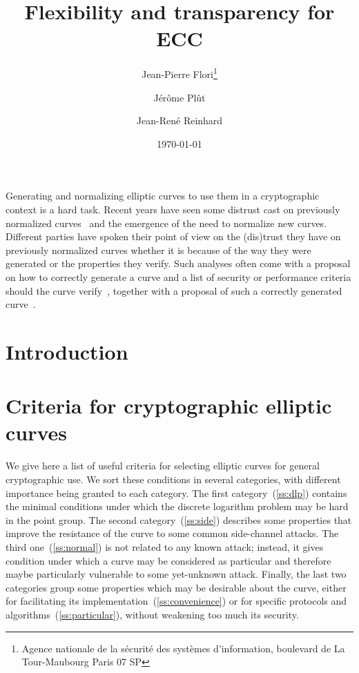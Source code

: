 \documentclass[twocolumn,letterpaper]{article}
\begin{document}
\sloppy

\title{Flexibility and transparency for ECC}
\author{Jean-Pierre Flori\thanks{{\noindent}Agence nationale de la sécurité des systèmes d'information, boulevard de La Tour-Maubourg Paris 07 SP}
\and Jérôme Plût\footnotemark[1] \and Jean-René Reinhard\footnotemark[1]}
\date{\today}
\maketitle

Generating and normalizing elliptic curves to use them in a cryptographic
context is a hard task.
Recent years have seen some distrust cast on previously normalized
curves~\cite{rfc5639,nist2000fips186-2,jorf2011ce}
and the emergence of the need to normalize new curves.
Different parties have spoken their point of view on the (dis)trust they have
on previously normalized curves whether it is because of the way
they were generated or the properties they verify.
Such analyses often come with a proposal on how to correctly generate a curve
and a list of security or performance criteria should the curve
verify~\cite{safecurves,msr2014bcln,eprint2014brainpool},
together with a proposal of such a correctly generated
curve~\cite{pkc2006bernstein,msr2014bcln}.


\section*{Introduction}

\section{Criteria for cryptographic elliptic curves}
\label{s:criteria}

We give here a list of useful criteria for selecting elliptic curves
for general cryptographic use.
We sort these conditions in several categories,
with different importance being granted to each category.
The first category~(\ref{ss:dlp}) contains the minimal conditions under which
the discrete logarithm problem may be hard in the point group.
The second category~(\ref{ss:side}) describes some properties that improve
the resistance of the curve to some common side-channel attacks.
The third one~(\ref{ss:normal}) is not related to any known attack;
instead, it gives condition under which a curve may be considered
as particular and therefore maybe particularly vulnerable
to some yet-unknown attack.
Finally, the last two categories group some properties
which may be desirable about the curve,
either for facilitating its implementation~(\ref{ss:convenience})
or for specific protocols and algorithms~(\ref{ss:particular}),
without weakening too much its security.
\end{document}
